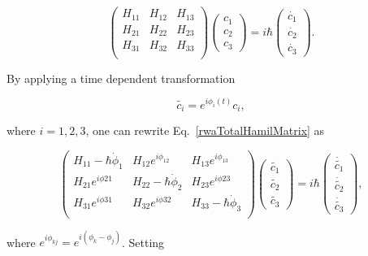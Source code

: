   \begin{equation}
  \begin{pmatrix}
  H_{11} & H_{12} & H_{13} \\   	H_{21} & H_{22} & H_{23} \\   	H_{31} & H_{32} & H_{33} \\
  \end{pmatrix}\begin{pmatrix}
  c_1\\c_2\\c_3
  \end{pmatrix} = i\hbar\begin{pmatrix}
  \dot{c_1} \\ \dot{c_2}\\\dot{c_3}
  \end{pmatrix}.
  \label{rwaTotalHamilMatrix}
  \end{equation}
  
  \noindent By applying a time dependent transformation
  
  \begin{equation}
  \label{eqn:InteractionTransformation}
  \widetilde{c_i} = e^{i\phi_{i}(t)}c_i,
  \end{equation}
  
  \noindent where $ i=1,2,3 $, one can rewrite Eq.~\eqref{rwaTotalHamilMatrix} as
  
  \begin{equation}
  \begin{pmatrix}
  H_{11}-\hbar\dot{\phi}_1 & H_{12}e^{i\phi_{12}} & H_{13}e^{i\phi_{13}} \\  H_{21}e^{i\phi{21}} & H_{22}-\hbar\dot{\phi}_2 & H_{23}e^{i\phi{23}} \\   	H_{31}e^{i\phi{31}} & H_{32}e^{i\phi{32}} & H_{33}-\hbar\dot{\phi}_3 \\
  \end{pmatrix}\begin{pmatrix}
  \widetilde{c_1}\\\widetilde{c_2}\\\widetilde{c_3}
  \end{pmatrix} = i\hbar\begin{pmatrix}
  \dot{\widetilde{c_1}} \\ \dot{\widetilde{c_2}}\\\dot{\widetilde{c_3}}
  \end{pmatrix},
  \label{rawMatrixAfterTransformation}
  \end{equation}
  
  \noindent where $ e^{i\phi_{kj}} = e^{i(\phi_k-\phi_j)} $. Setting 
  
